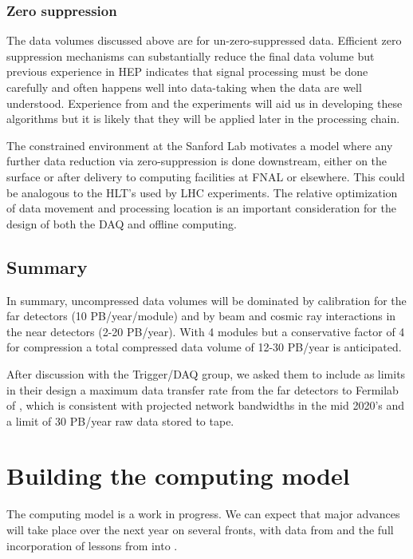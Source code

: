 \subsubsection{Zero suppression}

The data volumes discussed above are for un-zero-suppressed data.  Efficient zero suppression mechanisms can substantially reduce the final data volume but previous experience in HEP indicates that signal processing must be done carefully and often happens well into data-taking when the data are well understood.  Experience from   and the  experiments will aid us in developing these algorithms but it is likely that they will be applied later in the processing chain. 

The constrained environment at the Sanford Lab motivates a model where any further data reduction via zero-suppression is done downstream, either on the surface or after delivery to computing facilities at FNAL or elsewhere. This could be analogous to the HLT's used by LHC experiments. The relative optimization of data movement and processing location is an important consideration for the design of both the DAQ and offline computing.

\subsection{Summary}
In summary, uncompressed data volumes will be dominated by calibration for the far detectors (10 PB/year/module) and by beam and cosmic ray interactions in the near detectors (2-20 PB/year).   With 4  modules but a conservative factor of 4 for compression a total compressed data volume of 12-30 PB/year is anticipated. 

After discussion with the Trigger/DAQ group, we asked them to include as limits in their design a  maximum data transfer rate from the far detectors to Fermilab of \surffnalbw, which is consistent with projected network bandwidths in the mid 2020's and a limit of 30 PB/year raw data stored to tape.  



\section{Building the computing model}\label{sw:bld-cmp-mdl}

The   computing model is a work in progress.  We can expect that major advances will take place over the next year on several fronts, with data from  and the full incorporation of lessons from   into  . 


